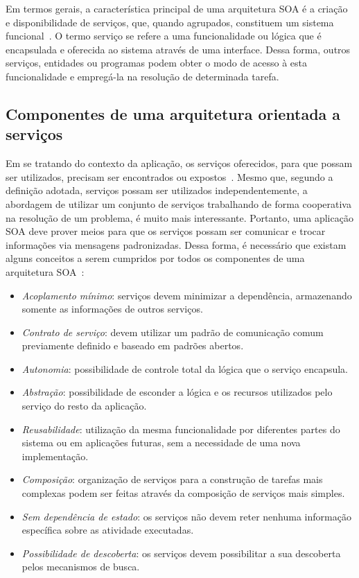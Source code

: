 Em termos gerais, a característica principal de uma arquitetura \gls{SOA} é a criação e
disponibilidade de serviços, que, quando agrupados, constituem um sistema
funcional~\cite{josuttis2009soa}. O termo serviço se refere a uma funcionalidade ou lógica que é
encapsulada e oferecida ao sistema através de uma interface. Dessa forma, outros serviços, entidades
ou programas podem obter o modo de acesso à esta funcionalidade e empregá-la na resolução de
determinada tarefa.


\subsection{Componentes de uma arquitetura orientada a serviços}

Em se tratando do contexto da aplicação, os serviços oferecidos, para que possam ser utilizados,
precisam ser encontrados ou expostos~\cite{papazoglou2007service}. Mesmo que, segundo a definição
adotada, serviços possam ser utilizados independentemente, a abordagem de utilizar um conjunto de
serviços trabalhando de forma cooperativa na resolução de um problema, é muito mais interessante.
Portanto, uma aplicação \gls{SOA} deve prover meios para que os serviços possam ser comunicar e
trocar informações via mensagens padronizadas. Dessa forma, é necessário que existam alguns
conceitos a serem cumpridos por todos os componentes de uma arquitetura
\gls{SOA}~\cite{erl2005service}:

\begin{itemize}
  \item \emph{Acoplamento mínimo}: serviços devem minimizar a dependência, armazenando somente as
  informações de outros serviços.

  \item \emph{Contrato de serviço}: devem utilizar um padrão de comunicação comum previamente
  definido e baseado em padrões abertos.

  \item \emph{Autonomia}: possibilidade de controle total da lógica que o serviço encapsula.

  \item \emph{Abstração}: possibilidade de esconder a lógica e os recursos utilizados pelo serviço
  do resto da aplicação.

  \item \emph{Reusabilidade}: utilização da mesma funcionalidade por diferentes partes do sistema ou
  em aplicações futuras, sem a necessidade de uma nova implementação.

  \item \emph{Composição}: organização de serviços para a construção de tarefas mais complexas podem
  ser feitas através da composição de serviços mais simples.

  \item \emph{Sem dependência de estado}: os serviços não devem reter nenhuma informação específica
  sobre as atividade executadas.

  \item \emph{Possibilidade de descoberta}: os serviços devem possibilitar a sua descoberta pelos
  mecanismos de busca.
\end{itemize}

